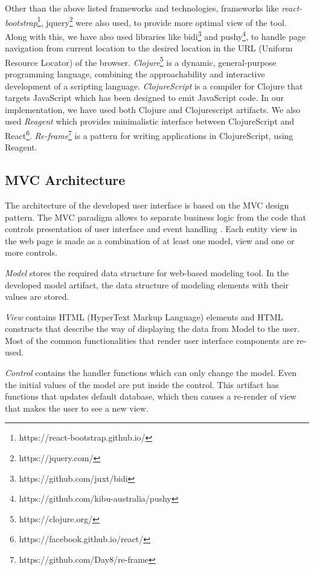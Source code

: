 Other than the above listed frameworks and technologies, frameworks like \textit{react-bootstrap}\footnote{https://react-bootstrap.github.io/}, jquery\footnote{https://jquery.com/} were also used, to provide more optimal view of the tool. Along with this, we have also used libraries like bidi\footnote{https://github.com/juxt/bidi} and pushy\footnote{https://github.com/kibu-australia/pushy}, to handle page navigation from current location to the desired location in the URL (Uniform Resource Locator) of the browser. \textit{Clojure}\footnote{https://clojure.org/} is a dynamic, general-purpose programming language, combining the approachability and interactive development of a scripting language. \textit{ClojureScript} is a compiler for Clojure that targets JavaScript which has been designed to emit JavaScript code. In our implementation, we have used both Clojure and Clojurescript artifacts. We also used \textit{Reagent} which provides minimalistic interface between ClojureScript and React\footnote{https://facebook.github.io/react/}. \textit{Re-frame}\footnote{https://github.com/Day8/re-frame} is a pattern for writing applications in ClojureScript, using Reagent.

\subsection{MVC Architecture}
\label{subsec:mvcarch}
The architecture of the developed user interface is based on the MVC design pattern. The MVC paradigm allows to separate business logic from the code that controls presentation of user interface and event handling \cite{Oracle2016}. Each entity view in the web page is made as a combination of at least one model, view and one or more controls. 

\textit{Model} stores the required data structure for web-based modeling tool. In the developed model artifact, the data structure of modeling elements with their values are stored. 

\textit{View} contains HTML (HyperText Markup Language) elements and HTML constructs that describe the way of displaying the data from Model to the user. Most of the common functionalities that render user interface components are re-used. 

\textit{Control} contains the handler functions which can only change the model. Even the initial values of the model are put inside the control. This artifact has functions that updates default database, which then causes a re-render of view that makes the user to see a new view.

